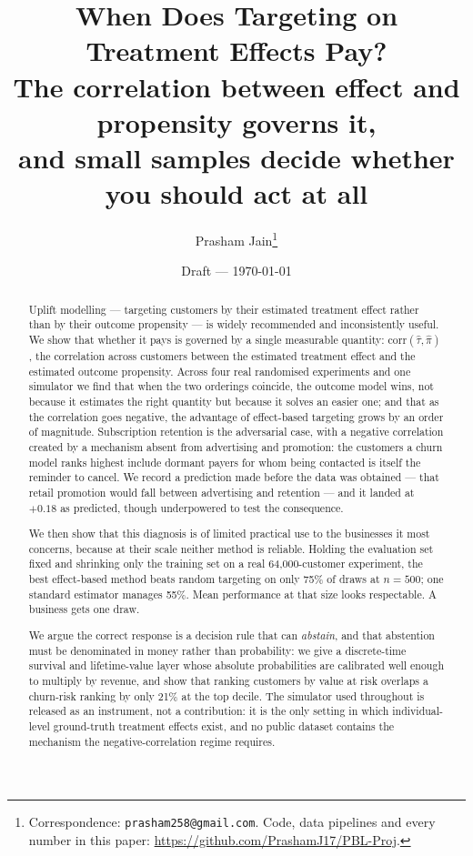 \documentclass[11pt,a4paper]{article}
\title{\textbf{When Does Targeting on Treatment Effects Pay?}\\
\large The correlation between effect and propensity governs it,\\
and small samples decide whether you should act at all}
\author{Prasham Jain\thanks{Correspondence: \texttt{prasham258@gmail.com}. Code,
data pipelines and every number in this paper:
\url{https://github.com/PrashamJ17/PBL-Proj}.}}
\date{Draft --- \today}
\newcommand{\corr}{\mathrm{corr}}
\newcommand{\CATE}{\tau}
\begin{document}
\maketitle

\begin{abstract}
Uplift modelling --- targeting customers by their estimated treatment effect rather
than by their outcome propensity --- is widely recommended and inconsistently
useful. We show that whether it pays is governed by a single measurable quantity:
$\corr(\hat\CATE, \hat\pi)$, the correlation across customers between the estimated
treatment effect and the estimated outcome propensity. Across four real randomised
experiments and one simulator we find that when the two orderings coincide, the
outcome model wins, not because it estimates the right quantity but because it
solves an easier one; and that as the correlation goes negative, the advantage of
effect-based targeting grows by an order of magnitude. Subscription retention is the
adversarial case, with a negative correlation created by a mechanism absent from
advertising and promotion: the customers a churn model ranks highest include dormant
payers for whom being contacted is itself the reminder to cancel. We record a
prediction made before the data was obtained --- that retail promotion would fall
between advertising and retention --- and it landed at $+0.18$ as predicted, though
underpowered to test the consequence.

We then show that this diagnosis is of limited practical use to the businesses it
most concerns, because at their scale neither method is reliable. Holding the
evaluation set fixed and shrinking only the training set on a real 64{,}000-customer
experiment, the best effect-based method beats random targeting on only 75\% of
draws at $n=500$; one standard estimator manages 55\%. Mean performance at that size
looks respectable. A business gets one draw.

We argue the correct response is a decision rule that can \emph{abstain}, and that
abstention must be denominated in money rather than probability: we give a
discrete-time survival and lifetime-value layer whose absolute probabilities are
calibrated well enough to multiply by revenue, and show that ranking customers by
value at risk overlaps a churn-risk ranking by only 21\% at the top decile. The
simulator used throughout is released as an instrument, not a contribution: it is
the only setting in which individual-level ground-truth treatment effects exist, and
no public dataset contains the mechanism the negative-correlation regime requires.
\end{abstract}
\end{document}
